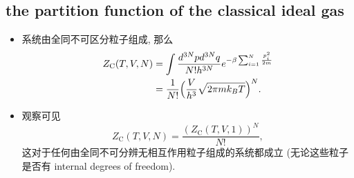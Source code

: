 \subsection{the partition function of the classical ideal gas} \label{subsection 3.3.1}
\begin{itemize}
	\item 系统由全同不可区分粒子组成, 那么
	\begin{align}
		Z_\text{C}(T, V, N) &= \int \frac{d^{3 N} p d^{3 N} q}{N! h^{3 N}} e^{- \beta \sum_{i = 1}^N \frac{p_i^2}{2 m}} \notag \\
		&= \frac{1}{N!} \Big( \frac{V}{h^3} \sqrt{2 \pi m k_B T} \Big)^N.
	\end{align}
	
	\item 观察可见
	\begin{equation}
		Z_\text{C}(T, V , N) = \frac{(Z_\text{C}(T, V , 1))^N}{N!},
	\end{equation}
	这对于任何由全同不可分辨无相互作用粒子组成的系统都成立 (无论这些粒子是否有 internal degrees of freedom).
\end{itemize}

